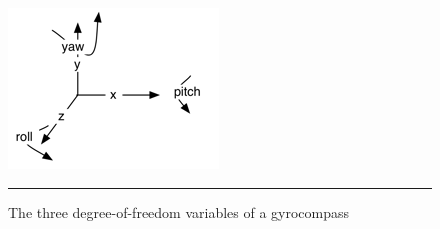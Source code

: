 \begin{figure}[htbp]
	\centering
	\includegraphics{./Primitives/yaw_pitch_roll.png}
	\rule{35em}{0.5pt}
	\caption[The three degree-of-freedom variables of a gyrocompass]{The three degree-of-freedom variables of a gyrocompass}
	\label{fig:YawPitchRoll}
\end{figure}
